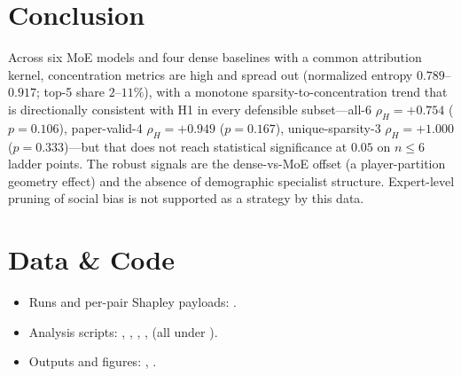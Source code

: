 \documentclass[sigconf]{acmart}
\begin{document}
\section{Conclusion}
Across six MoE models and four dense baselines with a common attribution
kernel, concentration metrics are high and spread out (normalized entropy
$0.789$--$0.917$; top-5 share $2$--$11\%$), with a monotone
sparsity-to-concentration trend that is directionally consistent with H1 in
every defensible subset---all-6 $\rho_H = +0.754$ ($p = 0.106$),
paper-valid-4 $\rho_H = +0.949$ ($p = 0.167$), unique-sparsity-3
$\rho_H = +1.000$ ($p = 0.333$)---but that does not reach statistical
significance at $0.05$ on $n \le 6$ ladder points. The robust signals are
the dense-vs-MoE offset (a player-partition geometry effect) and the
absence of demographic specialist structure. Expert-level pruning of
social bias is not supported as a strategy by this data.


\section*{Data \& Code}
\begin{itemize}\setlength\itemsep{0pt}
\item Runs and per-pair Shapley payloads:
  .
\item Analysis scripts: ,
  , ,
  , 
  (all under ).
\item Outputs and figures: ,
  .
\end{itemize}
\end{document}
